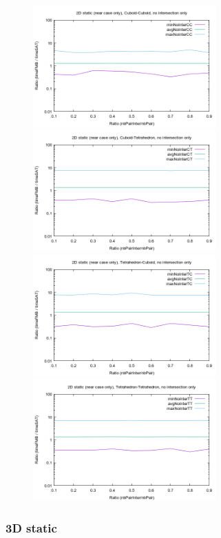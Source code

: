 \documentclass[12pt, a4paper]{article}
\begin{document}
\begin{center}
\begin{figure}[H]
\centering\includegraphics[width=7cm]{../Results/qualification2DCCnointerNearCaseOnly.png}
\centering\includegraphics[width=7cm]{../Results/qualification2DCTnointerNearCaseOnly.png}
\centering\includegraphics[width=7cm]{../Results/qualification2DTCnointerNearCaseOnly.png}
\centering\includegraphics[width=7cm]{../Results/qualification2DTTnointerNearCaseOnly.png}
\end{figure}
\end{center}

\subsubsection{3D static}
\end{document}
